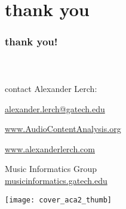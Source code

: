     \section[thanks]{thank you}

      \begin{frame}\frametitle{thank you!}\framesubtitle{~}
            \begin{block}{contact}
                Alexander Lerch:
                
                \href{mailto:alexander.lerch@gatech.edu}{alexander.lerch@gatech.edu}
                
                \bigskip                
                \href{https://www.AudioContentAnalysis.org}{www.AudioContentAnalysis.org}
                
                \href{http://www.alexanderlerch.com}{www.alexanderlerch.com}

                \bigskip
                Music Informatics Group\\
                \href{http://musicinformatics.gatech.edu}{musicinformatics.gatech.edu}

                \vspace{-35mm}
                \begin{flushright}
                \texttt{[image: cover\_aca2\_thumb]}
                \end{flushright}
                \vspace{5mm}
            \end{block}
            
        \end{frame}
